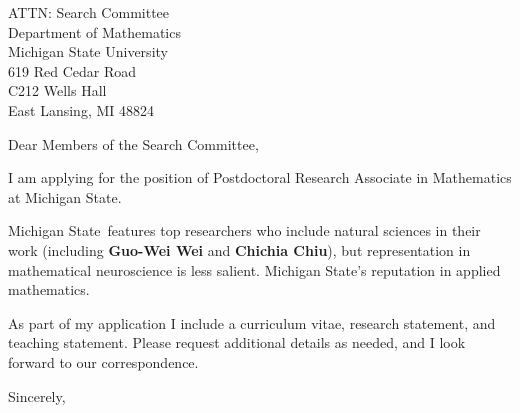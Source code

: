 \documentclass[11pt,a4paper]{letter}
\begin{document}

\def\School{Michigan State}
\begin{letter}
{ATTN: Search Committee\\
Department of Mathematics\\
Michigan State University\\
619 Red Cedar Road\\
C212 Wells Hall\\
East Lansing, MI 48824}


\opening{Dear Members of the Search Committee,}

I am applying for the position of Postdoctoral Research Associate in Mathematics at \School. 



\School~features top researchers who include natural sciences in their work (including \textbf{ Guo-Wei Wei} and \textbf{Chichia Chiu}), but representation in mathematical neuroscience is less salient. \School's reputation in applied mathematics.



As part of my application I include a curriculum vitae, research statement, and teaching statement. Please request additional details as needed, and I look forward to our correspondence.

\closing{Sincerely,}
\end{letter}
\end{document}
